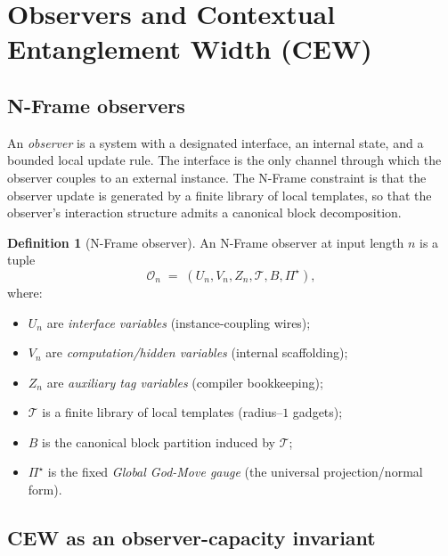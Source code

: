 \documentclass[12pt]{article}
\theoremstyle{definition}
\newtheorem{definition}{Definition}
\theoremstyle{definition}
\theoremstyle{remark}
\theoremstyle{remark}
\begin{document}

\section{Observers and Contextual Entanglement Width (CEW)}
\label{sec:observers-cew}

\subsection{N-Frame observers}
\label{subsec:nframe-observers}

An \emph{observer} is a system with a designated interface, an internal state, and a
bounded local update rule.  The interface is the only channel through which the observer
couples to an external instance.  The N-Frame constraint is that the observer update is
generated by a finite library of local templates, so that the observer's interaction
structure admits a canonical block decomposition.

\begin{definition}[N-Frame observer]
\label{def:nframe-observer}
An N-Frame observer at input length $n$ is a tuple
\[
\mathcal{O}_n \;=\; (U_n,V_n,Z_n,\mathcal{T},B,\Pi^\star),
\]
where:
\begin{itemize}
\item $U_n$ are \emph{interface variables} (instance-coupling wires);
\item $V_n$ are \emph{computation/hidden variables} (internal scaffolding);
\item $Z_n$ are \emph{auxiliary tag variables} (compiler bookkeeping);
\item $\mathcal{T}$ is a finite library of local templates (radius--$1$ gadgets);
\item $B$ is the canonical block partition induced by $\mathcal{T}$;
\item $\Pi^\star$ is the fixed \emph{Global God-Move gauge} (the universal projection/normal form).
\end{itemize}
\end{definition}

\subsection{CEW as an observer-capacity invariant}
\label{subsec:def-cew-intrinsic}
\end{document}
